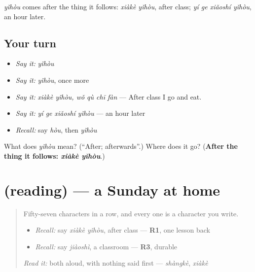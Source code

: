 \begin{grammarlens}[title={What you've built}]
\emph{yǐhòu} comes after the thing it follows: \emph{xiàkè yǐhòu}, after class; \emph{yí ge xiǎoshí yǐhòu}, an hour later.
\end{grammarlens}

\subsection*{Your turn}
\begin{itemize}
\raggedright
  \item \emph{Say it:} \emph{yǐhòu}
  \item \emph{Say it:} \emph{yǐhòu}, once more
  \item \emph{Say it:} \emph{xiàkè yǐhòu, wǒ qù chī fàn} — After class I go and eat.
  \item \emph{Say it:} \emph{yí ge xiǎoshí yǐhòu} — an hour later
  \item \emph{Recall:} say \emph{hòu}, then \emph{yǐhòu}
\end{itemize}

\begin{tcolorbox}[breakable,colback=teal!4,colframe=teal!35!black,title={Before you move on}]
What does \emph{yǐhòu} mean? (\textquotedblleft{}After; afterwards\textquotedblright{}.) Where does it go? (\textbf{After the thing it follows: \emph{xiàkè yǐhòu}}.)
\end{tcolorbox}
\section[(reading)]{(reading) — a Sunday at home}

\label{lesson:ZH-C97-reading}



\begin{quote}
Fifty-seven characters in a row, and every one is a character you write.

\begin{itemize}
\raggedright
  \item \emph{Recall:} say \emph{xiàkè yǐhòu}, after class — \textbf{R1}, one lesson back
  \item \emph{Recall:} say \emph{jiàoshì}, a classroom — \textbf{R3}, durable
\end{itemize}

\begin{quote}
 
\end{quote}

\emph{Read it:} both aloud, with nothing said first — \emph{shàngkè}, \emph{xiàkè}
\end{quote}

